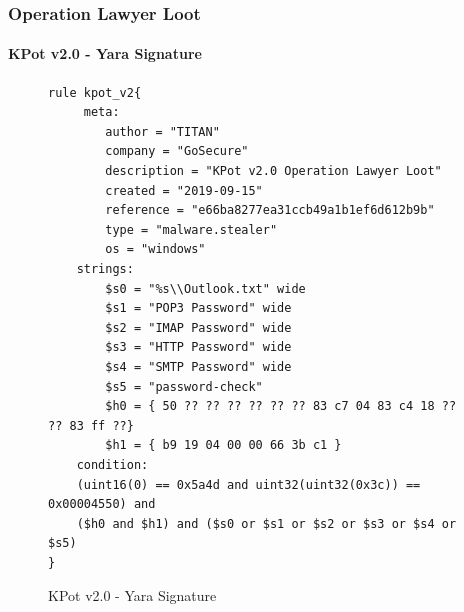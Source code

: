 \documentclass[aspectratio=169]{beamer}
\begin{document}
{
\begin{frame}[fragile]
  \frametitle{Operation Lawyer Loot}
  \framesubtitle{KPot v2.0 - Yara Signature}
\begin{figure}
\tiny{
\begin{verbatim}
rule kpot_v2{
     meta:
        author = "TITAN"
        company = "GoSecure"
        description = "KPot v2.0 Operation Lawyer Loot"
        created = "2019-09-15"
        reference = "e66ba8277ea31ccb49a1b1ef6d612b9b"
        type = "malware.stealer"
        os = "windows"
    strings:
        $s0 = "%s\\Outlook.txt" wide
        $s1 = "POP3 Password" wide
        $s2 = "IMAP Password" wide
        $s3 = "HTTP Password" wide
        $s4 = "SMTP Password" wide
        $s5 = "password-check"
        $h0 = { 50 ?? ?? ?? ?? ?? ?? 83 c7 04 83 c4 18 ?? ?? 83 ff ??}
        $h1 = { b9 19 04 00 00 66 3b c1 }
    condition:
    (uint16(0) == 0x5a4d and uint32(uint32(0x3c)) == 0x00004550) and
    ($h0 and $h1) and ($s0 or $s1 or $s2 or $s3 or $s4 or $s5)
}
\end{verbatim}
}
\caption{KPot v2.0 - Yara Signature}
\end{figure}
\end{frame}
}
\end{document}

